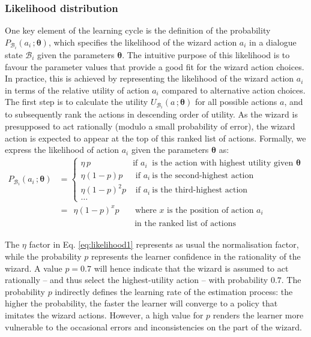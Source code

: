 \subsubsection*{Likelihood distribution}
One key element of the learning cycle is the definition of the probability $P_{\mathcal{B}_i}(a_i\,; \boldsymbol\theta)$, which specifies the likelihood of the wizard action $a_i$ in a dialogue state $\mathcal{B}_i$ given the parameters $\boldsymbol\theta$. The intuitive purpose of this likelihood is to favour the parameter values that provide a good fit for the wizard action choices. In practice, this is achieved by representing the likelihood of the wizard action $a_i$ in terms of the relative utility of action $a_i$ compared to alternative action choices. The first step is to calculate the utility $U_{\mathcal{B}_i}(a\,; \boldsymbol\theta)$ for all possible actions $a$, and to subsequently rank the actions in descending order of utility.  As the wizard is presupposed to act rationally (modulo a small probability of error), the wizard action is expected to appear at the top of this ranked list of actions. Formally, we express the likelihood of action $a_i$ given the parameters $\boldsymbol\theta$ as:
\begin{align}
P_{\mathcal{B}_i}(a_i\,; \boldsymbol\theta) & = \begin{cases} \eta \, p & \text{if } a_i \ \text{ is the action with highest utility given } \boldsymbol\theta  \\
\eta (1-p) p & \text{ if } a_i \ \text{is the second-highest action} \\
\eta (1-p)^2 p & \text{ if } a_i \ \text{is the third-highest action} \\ 
\dots
\end{cases} \nonumber \\[1mm]
& = \ \ \eta (1-p)^x p \ \ \ \ \ \ \ \text{ where } x \text{ is the position of action } a_i \label{eq:likelihood1} \\[-2mm]
&  \phantom{= (1-p)^x p} \ \ \ \ \ \ \ \ \ \ \ \text{ in the ranked list of actions}  \nonumber
\end{align}

The $\eta$ factor in Eq. \eqref{eq:likelihood1} represents as usual the normalisation factor, while the probability $p$  represents the learner confidence in the rationality  of the wizard.  A value $p = 0.7$ will hence indicate that the wizard is assumed to act rationally -- and thus select the highest-utility action -- with probability $0.7$. The probability $p$ indirectly defines the learning rate of the estimation process: the higher the probability, the faster the learner will converge to a policy that imitates the wizard actions.  However, a high value for $p$ renders the learner more vulnerable to the occasional errors and inconsistencies on the part of the wizard. 


